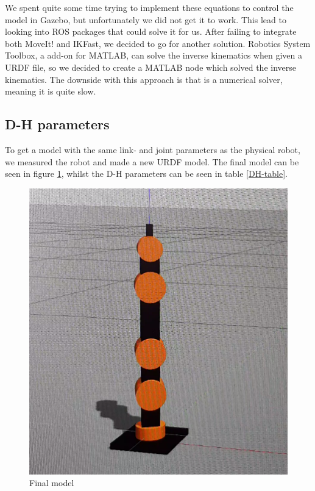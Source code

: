 \documentclass[11pt,a4paper, titlepage]{article}
\begin{document}
We spent quite some time trying to implement these equations to control the model in Gazebo, but unfortunately we did not get it to work. This lead to looking into ROS packages that could solve it for us. After failing to integrate both MoveIt! and  IKFast, we decided to go for another solution. Robotics System Toolbox, a add-on for MATLAB, can solve the inverse kinematics when given a URDF file, so we decided to create a MATLAB node which solved the inverse kinematics. The downside with this approach is that is a numerical solver, meaning it is quite slow.

	\subsection{D-H parameters}
	To get a model with the same link- and joint parameters as the physical robot, we measured the robot and made a new URDF model. The final model can be seen in figure \ref{fig:urdf-final}, whilst the D-H parameters can be seen in table \ref{DH-table}.
	
	\begin{figure}[H]
		\centering
		\includegraphics[width=0.7\linewidth]{../Diagrams/URDF-final.png}
		
		\caption{Final model}
		\label{fig:urdf-final}
	\end{figure}	
		
\end{document}
